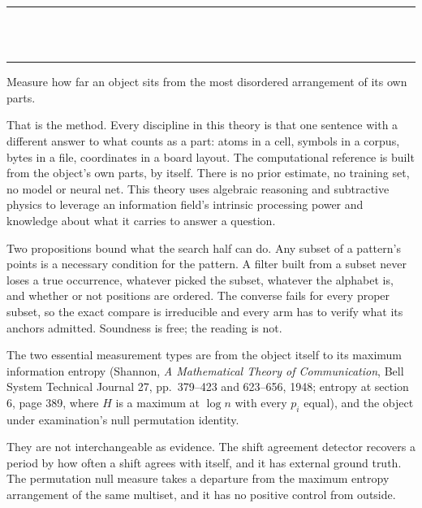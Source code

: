 \thispagestyle{empty}
\begin{center}
  \rule{\textwidth}{0.4pt}\\[0.9em]
  {\Large{}}\\[0.7em]
  \rule{\textwidth}{0.4pt}
\end{center}
\bigskip

Measure how far an object sits from the most disordered arrangement of its own parts.

That is the method. Every discipline in this theory is that one sentence with a different answer to
what counts as a part: atoms in a cell, symbols in a corpus, bytes in a file, coordinates in a board
layout. The computational reference is built from the object's own parts, by itself. There is no prior
estimate, no training set, no model or neural net. This theory uses algebraic reasoning and
subtractive physics to leverage an information field's intrinsic processing power and knowledge
about what it carries to answer a question.

Two propositions bound what the search half can do. Any subset of a pattern's points is a necessary
condition for the pattern. A filter built from a subset never loses a true occurrence, whatever
picked the subset, whatever the alphabet is, and whether or not positions are ordered. The converse fails for every proper subset, so the exact compare is irreducible and every
arm has to verify what its anchors admitted. Soundness is free; the reading is not.

The two essential measurement types are from the object itself to its maximum information entropy
(Shannon, \emph{A Mathematical Theory of Communication}, Bell System Technical Journal 27,
pp.~379--423 and 623--656, 1948; entropy at section 6, page 389, where $H$ is a maximum at
$\log n$ with every $p_i$ equal), and the object under examination's null permutation identity.

They are not interchangeable as evidence. The shift agreement detector recovers a period by how
often a shift agrees with itself, and it has external ground truth. The permutation null measure
takes a departure from the maximum entropy arrangement of the same multiset, and it has no positive
control from outside.

